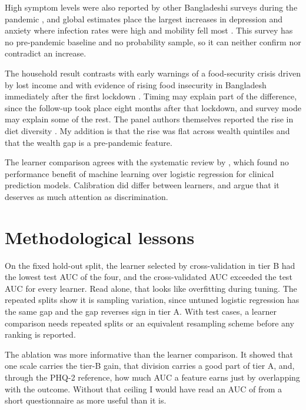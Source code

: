 High symptom levels were also reported by other Bangladeshi surveys during the pandemic \parencite{islam2020,banna2022}, and global estimates place the largest increases in depression and anxiety where infection rates were high and mobility fell most \parencite{santomauro2021}. This survey has no pre-pandemic baseline and no probability sample, so it can neither confirm nor contradict an increase.

The household result contrasts with early warnings of a food-security crisis driven by lost income \parencite{laborde2020} and with evidence of rising food insecurity in Bangladesh immediately after the first lockdown \parencite{hamadani2020}. Timing may explain part of the difference, since the follow-up took place eight months after that lockdown, and survey mode may explain some of the rest. The panel authors themselves reported the rise in diet diversity \parencite{panel2021}. My addition is that the rise was flat across wealth quintiles and that the wealth gap is a pre-pandemic feature.

The learner comparison agrees with the systematic review by \textcite{christodoulou2019}, which found no performance benefit of machine learning over logistic regression for clinical prediction models. Calibration did differ between learners, and \textcite{vancalster2019} argue that it deserves as much attention as discrimination.

\section{Methodological lessons}
On the fixed hold-out split, the learner selected by cross-validation in tier B had the lowest test AUC of the four, and the cross-validated AUC exceeded the test AUC for every learner. Read alone, that looks like overfitting during tuning. The repeated splits show it is sampling variation, since untuned logistic regression has the same gap and the gap reverses sign in tier A. With \MlTestN{} test cases, a learner comparison needs repeated splits or an equivalent resampling scheme before any ranking is reported.

The ablation was more informative than the learner comparison. It showed that one scale carries the tier-B gain, that division carries a good part of tier A, and, through the PHQ-2 reference, how much AUC a feature earns just by overlapping with the outcome. Without that ceiling I would have read an AUC of \AblB{} from a short questionnaire as more useful than it is.

